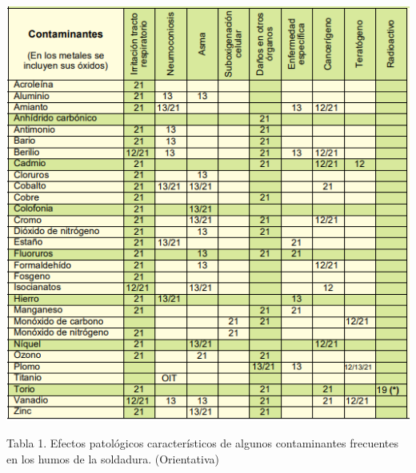 \documentclass[12pt,letterpaper]{article}
\begin{document}
\includegraphics[scale=1.3]{imag4.png}  

\begin{center}
Tabla 1. Efectos patológicos característicos de algunos contaminantes frecuentes en los humos de la soldadura. (Orientativa)
\end{center}
\end{document}

